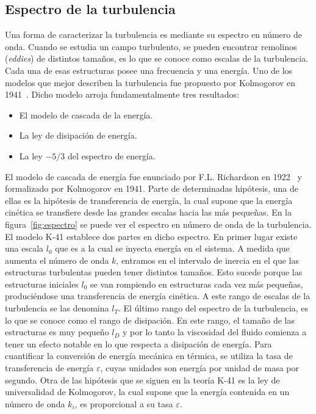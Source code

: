 \subsection{Espectro de la turbulencia}
Una forma de caracterizar la turbulencia es mediante su espectro en número de onda.
Cuando se estudia un campo turbulento, se pueden encontrar remolinos (\textit{eddies}) de distintos
tamaños, es lo que se conoce como escalas de la turbulencia. Cada una de esas estructuras
posee una frecuencia y una energía.
Uno de los modelos que mejor describen la turbulencia fue propuesto por Kolmogorov en
1941~\cite{20000584634}. Dicho modelo arroja fundamentalmente tres resultados:
\begin{itemize}
    \item El modelo de cascada de la energía.
    \item La ley de disipación de energía.
    \item La ley $-5/3$ del espectro de energía.
\end{itemize}
El modelo de cascada de energía fue enunciado por F.L. Richardson en 1922~\cite{richardson_lynch_2007} y formalizado
por Kolmogorov en 1941\cite{20000584634}. Parte de determinadas hipótesis, una de ellas es la hipótesis de
transferencia de energía, la cual supone que la energía cinética se transfiere desde las grandes
escalas hacia las más pequeñas.
En la figura~\ref{fig:espectro} se puede ver el espectro en número de onda de la turbulencia. El modelo
K-41 establece dos partes en dicho espectro. En primer lugar existe una escala $l_0$ que es a la
cual se inyecta energía en el sistema.
A medida que aumenta el número de onda $k$, entramos en el intervalo de inercia en el que
las estructuras turbulentas pueden tener distintos tamaños. Esto sucede porque las estructuras
iniciales $l_0$ se van rompiendo en estructuras cada vez más pequeñas, produciéndose una
transferencia de energía cinética. A este rango de escalas de la turbulencia se las denomina
$l_T$. El último rango del espectro de la turbulencia, es lo que se conoce como el rango de
disipación. En este rango, el tamaño de las estructuras es muy pequeño $l_D$ y por lo tanto la
viscosidad del fluido comienza a tener un efecto notable en lo que respecta a disipación de
energía. Para cuantificar la conversión de energía mecánica en térmica, se utiliza la tasa de
transferencia de energía $\varepsilon$, cuyas unidades son energía por unidad de masa por segundo.
Otra de las hipótesis que se siguen en la teoría K-41 es la ley de universalidad de Kolmogorov,
la cual supone que la energía contenida en un número de onda $k_i$, es proporcional a su tasa $\varepsilon$. 

